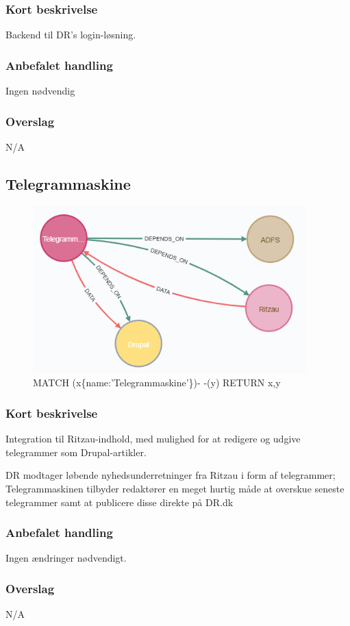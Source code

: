 \documentclass{article}
\begin{document}
\subsubsection{Kort beskrivelse}
Backend til DR's login-løsning.
\subsubsection{Anbefalet handling}
Ingen nødvendig
\subsubsection{Overslag}
N/A

\subsection{Telegrammaskine}
\begin{figure}[h]
\includegraphics[width=300pt]{Telegrammaskine.PNG}
\caption{MATCH (x\{name:'Telegrammaskine'\})- -(y) RETURN x,y}
\end{figure}
\subsubsection{Kort beskrivelse}
Integration til Ritzau-indhold, med mulighed for at redigere og udgive telegrammer som Drupal-artikler.	

DR modtager løbende nyhedsunderretninger fra Ritzau i form af telegrammer; Telegrammaskinen tilbyder redaktører en meget hurtig måde at overskue seneste telegrammer samt at publicere disse direkte på DR.dk
\subsubsection{Anbefalet handling}
Ingen ændringer nødvendigt.
\subsubsection{Overslag}
N/A
\end{document}
